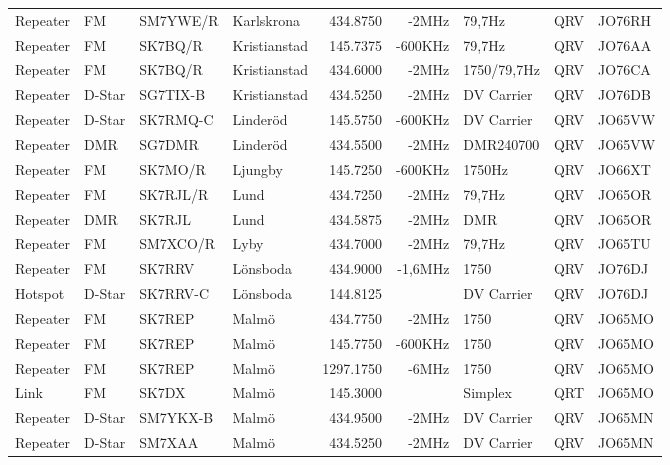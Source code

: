 \begin{longtable}{llllrrlcl}
Repeater & FM     & SM7YWE/R & Karlskrona          & 434.8750  & -2MHz   & 79,7Hz       & QRV  & JO76RH \\
Repeater & FM     & SK7BQ/R  & Kristianstad        & 145.7375  & -600KHz & 79,7Hz       & QRV  & JO76AA \\
Repeater & FM     & SK7BQ/R  & Kristianstad        & 434.6000  & -2MHz   & 1750/79,7Hz  & QRV  & JO76CA \\
Repeater & D-Star & SG7TIX-B & Kristianstad        & 434.5250  & -2MHz   & DV Carrier   & QRV  & JO76DB \\
Repeater & D-Star & SK7RMQ-C & Linderöd            & 145.5750  & -600KHz & DV Carrier   & QRV  & JO65VW \\
Repeater & DMR    & SG7DMR   & Linderöd            & 434.5500  & -2MHz   & DMR240700    & QRV  & JO65VW \\
Repeater & FM     & SK7MO/R  & Ljungby             & 145.7250  & -600KHz & 1750Hz       & QRV  & JO66XT \\
Repeater & FM     & SK7RJL/R & Lund                & 434.7250  & -2MHz   & 79,7Hz       & QRV  & JO65OR \\
Repeater & DMR    & SK7RJL   & Lund                & 434.5875  & -2MHz   & DMR          & QRV  & JO65OR \\
Repeater & FM     & SM7XCO/R & Lyby                & 434.7000  & -2MHz   & 79,7Hz       & QRV  & JO65TU \\
Repeater & FM     & SK7RRV   & Lönsboda            & 434.9000  & -1,6MHz & 1750         & QRV  & JO76DJ \\
Hotspot  & D-Star & SK7RRV-C & Lönsboda            & 144.8125  &         & DV Carrier   & QRV  & JO76DJ \\
Repeater & FM     & SK7REP   & Malmö               & 434.7750  & -2MHz   & 1750         & QRV  & JO65MO \\
Repeater & FM     & SK7REP   & Malmö               & 145.7750  & -600KHz & 1750         & QRV  & JO65MO \\
Repeater & FM     & SK7REP   & Malmö               & 1297.1750 & -6MHz   & 1750         & QRV  & JO65MO \\
Link     & FM     & SK7DX    & Malmö               & 145.3000  &         & Simplex      & QRT  & JO65MO \\
Repeater & D-Star & SM7YKX-B & Malmö               & 434.9500  & -2MHz   & DV Carrier   & QRV  & JO65MN \\
Repeater & D-Star & SM7XAA   & Malmö               & 434.5250  & -2MHz   & DV Carrier   & QRV  & JO65MN \\

\end{longtable}
